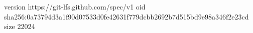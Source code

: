 version https://git-lfs.github.com/spec/v1
oid sha256:0a73794d3a1f90d07533d0fe42631f779dcbb2692b7d515bd9e98a346f2e23cd
size 22024
